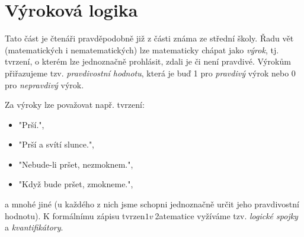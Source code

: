\section{Výroková logika}\label{sec:vyrokova_logika}

Tato část je čtenáři pravděpodobně již z části známa ze střední školy. Řadu vět (matematických i nematematických) lze matematicky chápat jako \emph{výrok}, tj. tvrzení, o kterém lze jednoznačně prohlásit, zdali je či není pravdivé. Výrokům přiřazujeme tzv. \emph{pravdivostní hodnotu}, která je buď 1 pro \emph{pravdivý} výrok nebo 0 pro \emph{nepravdivý} výrok.\par
Za výroky lze považovat např. tvrzení:
\begin{itemize}
    \item "Prší.",
    \item "Prší a svítí slunce.",
    \item "Nebude-li pršet, nezmoknem.",
    \item "Když bude pršet, zmokneme.",
\end{itemize}
a mnohé jiné (u každého z nich jsme schopni jednoznačně určit jeho pravdivostní hodnotu). K formálnímu zápisu tvrzen$1 v~$2atematice vyžíváme tzv. \emph{logické spojky} a \emph{kvantifikátory}.

